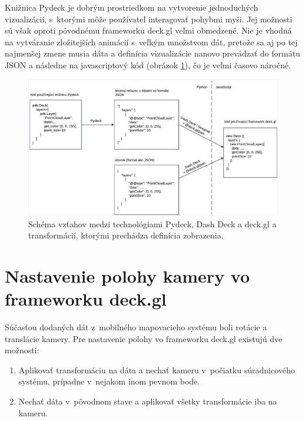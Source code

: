Knižnica Pydeck je dobrým prostriedkom na vytvorenie jednoduchých vizualizácií, s~ktorými môže používateľ interagovať pohybmi myši. Jej možnosti sú však oproti pôvodnému frameworku deck.gl veľmi obmedzené. Nie je vhodná na vytváranie zložitejších animácií s~veľkým množstvom dát, pretože sa aj po tej najmenšej zmene musia dáta a definícia vizualizácie nanovo prevádzať do formátu JSON a následne na javascriptový kód (obrázok \ref{fig:pydeck_dashdeck_schema}), čo je veľmi časovo náročné.

\begin{figure}[h]
    \centering
    \includegraphics[width=1\linewidth]{text_prace/obrazky-figures/pydeck_dashdeck_transformacie.pdf}
    \caption[Schéma vzťahov medzi technológiami Pydeck, Dash Deck a deck.gl.]{Schéma vzťahov medzi technológiami Pydeck, Dash Deck a deck.gl a transformácií, ktorými prechádza definícia zobrazenia.}
    \label{fig:pydeck_dashdeck_schema}
\end{figure}

\section{Nastavenie polohy kamery vo frameworku deck.gl}
\label{sec:nastavenie_polohy_kamery}

Súčasťou dodaných dát z~mobilného mapovacieho systému boli rotácie a translácie kamery. Pre nastavenie polohy vo frameworku deck.gl existujú dve možnosti:

\begin{enumerate}
    \item Aplikovať transformáciu na dáta a nechať kameru v~počiatku súradnicového systému, prípadne v~nejakom inom pevnom bode.
    \item Nechať dáta v~pôvodnom stave a aplikovať všetky transformácie iba na kameru.
\end{enumerate}

